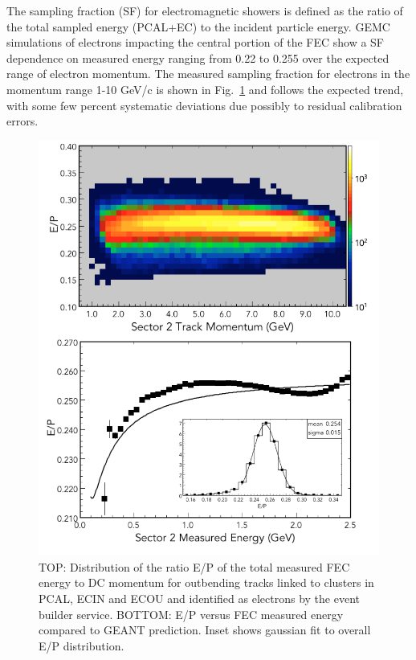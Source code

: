 The sampling fraction (SF) for electromagnetic showers is defined as the ratio of the total sampled energy (PCAL+EC) to the incident particle energy.  GEMC simulations of electrons impacting the central portion of the FEC show a SF dependence on measured energy ranging from 0.22 to 0.255 over the expected range of electron momentum.  The measured sampling fraction for electrons in the momentum range 1-10 GeV/c is shown in Fig.~\ref{fig:S10_1_0} and follows the expected trend, with some few percent systematic deviations due possibly to residual calibration errors.

\begin{figure}[hbt]
\centering
\includegraphics[width=1.0\columnwidth,keepaspectratio]{img/S10_1_0.png}
\caption[]{TOP: Distribution of the ratio E/P of the total measured FEC energy to DC momentum for outbending tracks linked to clusters in PCAL, ECIN and ECOU and identified as electrons by the event builder service.  BOTTOM: E/P versus FEC measured energy compared to GEANT prediction.  Inset shows gaussian fit to overall E/P distribution.}
\label{fig:S10_1_0}
\end{figure}

